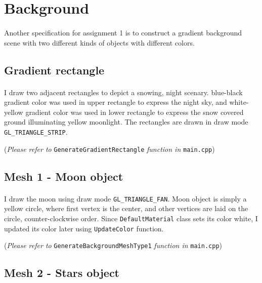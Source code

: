 \documentclass[10pt,a4paper]{article}
\begin{document}
		
	\section{Background}
	\paragraph{}
	Another specification for assignment 1 is to construct a gradient background scene with two different kinds of objects with different colors. 
	
	\subsection{Gradient rectangle}
	\paragraph{}
	I draw two adjacent rectangles to depict a snowing, night scenary. blue-black gradient color was used in upper rectangle to express the night sky, and white-yellow gradient color was used in lower rectangle to express the snow covered ground illuminating yellow moonlight. The rectangles are drawn in draw mode \texttt{GL\_TRIANGLE\_STRIP}.
	
	\begin{flushright}
		(\emph{Please refer to} \texttt{GenerateGradientRectangle} \emph{function in} \texttt{main.cpp})
	\end{flushright}
	
	\subsection{Mesh 1 - Moon object}
	\paragraph{}
	I draw the moon using draw mode \texttt{GL\_TRIANGLE\_FAN}. Moon object is simply a yellow circle, where first vertex is the center, and other vertices are laid on the circle, counter-clockwise order. Since \texttt{DefaultMaterial} class sets its color white, I updated its color later using \texttt{UpdateColor} function.
	
	\begin{flushright}
		(\emph{Please refer to} \texttt{GenerateBackgroundMeshType1} \emph{function in} \texttt{main.cpp})
	\end{flushright}
	
	\subsection{Mesh 2 - Stars object}
\end{document}
